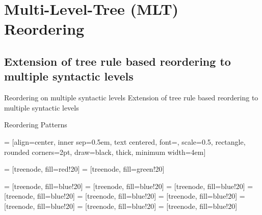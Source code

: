 \documentclass[18pt]{beamer}
\begin{document}
\section{Multi-Level-Tree (MLT) Reordering}
\subsection{Extension of tree rule based reordering to multiple syntactic levels}
\begin{frame}{Reordering on multiple syntactic levels}
Extension of tree rule based reordering to multiple syntactic levels 
\begin{figure}
\centering

\end{figure}
\end{frame}

\begin{frame}{Reordering Patterns}

 = [align=center, inner sep=0.5em, text centered, font=\sffamily, scale=0.5, rectangle, rounded corners=2pt, draw=black, thick, minimum width=4em]

 = [treenode, fill=red!20]
 = [treenode, fill=green!20]

 = [treenode, fill=blue!20]
 = [treenode, fill=blue!20]
 = [treenode, fill=blue!20]
 = [treenode, fill=blue!20]
 = [treenode, fill=blue!20]
 = [treenode, fill=blue!20]
 = [treenode, fill=blue!20]
 = [treenode, fill=blue!20]
 = [treenode, fill=blue!20]










\end{frame}
\end{document}
